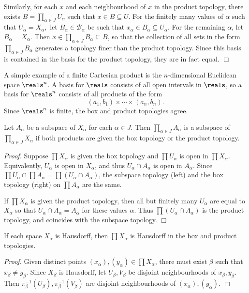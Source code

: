 Similarly, for each $x$ and each neighbourhood of $x$ in the product topology, there exists $B = \prod_{\alpha \in J} U_\alpha$ such that $x \in B \subseteq U$. For the finitely many values of $\alpha$ such that $U_\alpha = X_\alpha,$ let $B_\alpha \in \mathcal{B}_\alpha$ be such that $x_\alpha \in B_\alpha \subseteq U_\alpha$. For the remaining $\alpha$, let $B_\alpha = X_\alpha$. Then $x \in \prod_{\alpha \in J} B_\alpha \subseteq B$, so that the collection of all sets in the form $\prod_{\alpha \in J} B_\alpha$ generates a topology finer than the product topology. Since this basis is contained in the basis for the product topology, they are in fact equal. $\Box$

A simple example of a finite Cartesian product is the $n$-dimensional Euclidean space $\reals^n$. A basis for $\reals$ consists of all open intervals in $\reals$, so a basis for $\reals^n$ consists of all products of the form 
$$(a_1, b_1) \times \cdots \times (a_n, b_n).$$
Since $\reals^n$ is finite, the box and product topologies agree.

\begin{theorem}\label{2.48}
    Let $A_\alpha$ be a subspace of $X_\alpha$ for each $\alpha \in J$. Then $\prod_{\alpha \in J} A_\alpha$ is a subspace of $\prod_{\alpha \in J} X_\alpha$ if both products are given the box topology or the product topology.
\end{theorem}
{\it Proof.} Suppose $\prod X_\alpha$ is given the box topology and $\prod U_\alpha$ is open in $\prod X_\alpha$. Equivalently, $U_\alpha$ is open in $X_\alpha$, and thus $U_\alpha \cap A_\alpha$ is open in $A_\alpha$. Since $\prod U_\alpha \cap \prod A_\alpha = \prod (U_\alpha \cap A_\alpha)$, the subspace topology (left) and the box topology (right) on $\prod A_\alpha$ are the same. 

If $\prod X_\alpha$ is given the product topology, then all but finitely many $U_\alpha$ are equal to $X_\alpha$ so that $U_\alpha \cap A_\alpha = A_\alpha$ for these values $\alpha$. Thus $\prod (U_\alpha \cap A_\alpha)$ is the product topology, and coincides with the subspace topology. $\Box$

\begin{theorem}\label{2.49}
    If each space $X_\alpha$ is Hausdorff, then $\prod X_\alpha$ is Hausdorff in the box and product topologies.
\end{theorem}
{\it Proof.} Given distinct points $(x_\alpha), (y_\alpha) \in \prod X_\alpha$, there must exist $\beta$ such that $x_\beta \neq y_\beta$. Since $X_\beta$ is Hausdorff, let $U_\beta, V_\beta$ be disjoint neighbourhoods of $x_\beta, y_\beta$. Then $\pi_\beta^{-1}(U_\beta), \pi_\beta^{-1}(V_\beta)$ are disjoint neighbourhoods of $(x_\alpha), (y_\alpha)$. $\Box$

